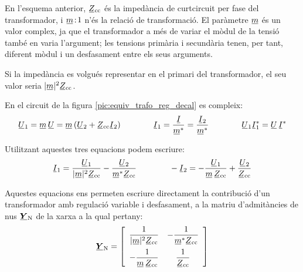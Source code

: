 En l'esquema anterior, $\cmplx{Z}\ped{cc}$ és la impedància de curtcircuit per fase del transformador, i $\cmplx{m}\!:\!1$ n'és la
relació de transformació. El paràmetre $\cmplx{m}$ és un valor
complex, ja que el transformador a més de variar el mòdul de la
tensió també en varia  l'argument; les tensions primària i
secundària tenen, per tant,  diferent mòdul i un desfasament entre els
seus arguments.

Si la impedància es volgués representar en el primari del
transformador, el seu valor seria $|\cmplx{m}|^2 \cmplx{Z}\ped{cc}$.

En el circuit de la figura \vref{pic:equiv_trafo_reg_decal} es
compleix: 
\begin{equation}
   \cmplx{U}_1 = \cmplx{m} \,\cmplx{U} = \cmplx{m}\,
   (\cmplx{U}_2+\cmplx{Z}\ped{cc}\cmplx{I}_2)
   \qquad\qquad
   \cmplx{I}_1 = \frac{\cmplx{I}}{\cmplx{m}^*} = \frac{\cmplx{I}_2}{\cmplx{m}^*}
   \qquad\qquad
   \cmplx{U}_1 \cmplx{I}_1^* = \cmplx{U} \,\cmplx{I}^*
\end{equation}

Utilitzant aquestes tres equacions podem escriure:
\begin{equation}
   \cmplx{I}_1 = \frac{\cmplx{U}_1}{|\cmplx{m}|^2 \cmplx{Z}\ped{cc}} - \frac{\cmplx{U}_2}
   {\cmplx{m}^* \cmplx{Z}\ped{cc}} \qquad\qquad
   - \cmplx{I}_2 = - \frac{\cmplx{U}_1}{\cmplx{m} \,\cmplx{Z}\ped{cc}} + \frac{\cmplx{U}_2}
   {\cmplx{Z}\ped{cc}}
\end{equation}

Aquestes equacions ens permeten escriure directament la
contribució d'un transformador amb regulació variable i desfasament, a
la matriu d'admitàncies de nus $\mcmplx{Y}\ped{N}$ de la xarxa a la
qual pertany: 
\begin{equation} \label{eq:yn_trafo_reg_decal}
   \mcmplx{Y}\ped{N} = 
   \begin{bmatrix}\begin{array}{cc} 
     \dfrac{1}{|\cmplx{m}|^2 \cmplx{Z}\ped{cc}} & - \dfrac{1}
   {\cmplx{m}^* \cmplx{Z}\ped{cc}} \\[2.5ex]
     - \dfrac{1}{\cmplx{m} \,\cmplx{Z}\ped{cc}} & \dfrac{1}
   {\cmplx{Z}\ped{cc}}
   \end{array}\end{bmatrix}
\end{equation}

